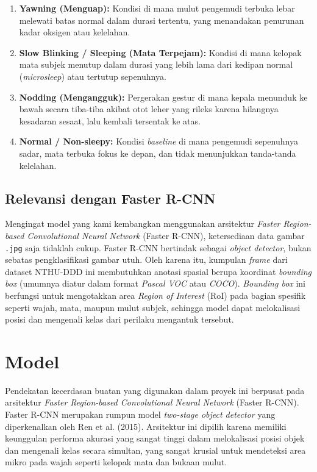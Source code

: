 \documentclass[11pt,a4paper,oneside]{report}
\begin{document}
\begin{enumerate}
    \item \textbf{Yawning (Menguap):} Kondisi di mana mulut pengemudi terbuka lebar melewati batas normal dalam durasi tertentu, yang menandakan penurunan kadar oksigen atau kelelahan.
    \item \textbf{Slow Blinking / Sleeping (Mata Terpejam):} Kondisi di mana kelopak mata subjek menutup dalam durasi yang lebih lama dari kedipan normal (\textit{microsleep}) atau tertutup sepenuhnya.
    \item \textbf{Nodding (Mengangguk):} Pergerakan gestur di mana kepala menunduk ke bawah secara tiba-tiba akibat otot leher yang rileks karena hilangnya kesadaran sesaat, lalu kembali tersentak ke atas.
    \item \textbf{Normal / Non-sleepy:} Kondisi \textit{baseline} di mana pengemudi sepenuhnya sadar, mata terbuka fokus ke depan, dan tidak menunjukkan tanda-tanda kelelahan.
\end{enumerate}

\subsection{Relevansi dengan Faster R-CNN}

Mengingat model yang kami kembangkan menggunakan arsitektur \textit{Faster Region-based Convolutional Neural Network} (Faster R-CNN), ketersediaan data gambar \texttt{.jpg} saja tidaklah cukup. Faster R-CNN bertindak sebagai \textit{object detector}, bukan sebatas pengklasifikasi gambar utuh. Oleh karena itu, kumpulan \textit{frame} dari dataset NTHU-DDD ini membutuhkan anotasi spasial berupa koordinat \textit{bounding box} (umumnya diatur dalam format \textit{Pascal VOC} atau \textit{COCO}). \textit{Bounding box} ini berfungsi untuk mengotakkan area \textit{Region of Interest} (RoI) pada bagian spesifik seperti wajah, mata, maupun mulut subjek, sehingga model dapat melokalisasi posisi dan mengenali kelas dari perilaku mengantuk tersebut.

\section{Model}

Pendekatan kecerdasan buatan yang digunakan dalam proyek ini berpusat pada arsitektur \textit{Faster Region-based Convolutional Neural Network} (Faster R-CNN). Faster R-CNN merupakan rumpun model \textit{two-stage object detector} yang diperkenalkan oleh Ren et al. (2015). Arsitektur ini dipilih karena memiliki keunggulan performa akurasi yang sangat tinggi dalam melokalisasi posisi objek dan mengenali kelas secara simultan, yang sangat krusial untuk mendeteksi area mikro pada wajah seperti kelopak mata dan bukaan mulut.
\end{document}
